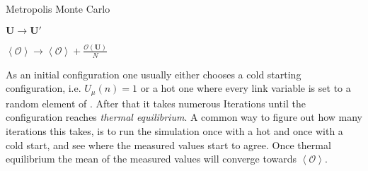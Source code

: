 \begin{algorithm}[!htb]
 \caption{Metropolis Monte Carlo}
 \label{alg:metroMonte}
 \begin{algorithmic}[1]
  \STATE {}

  \STATE {}
  \STATE {}
  \label{code:metroMonteIfCond}
  \STATE {}
  \STATE $\boldsymbol{U} \rightarrow \boldsymbol{U}'$
  \ENDIF

  \ENDFOR
  \STATE $\left\langle \mathcal{O} \right\rangle \rightarrow \left\langle \mathcal{O} \right\rangle + \frac{\mathcal{O}(\boldsymbol{U})}{N} $
  \ENDFOR
 \end{algorithmic}
\end{algorithm}
As an initial configuration one usually either chooses a cold starting configuration, i.e. $U_\mu(n)=1$ or a hot one where every link variable is set to a random element of \SUTwo. After that it takes numerous Iterations until the configuration reaches \emph{thermal equilibrium}. A common way to figure out how many iterations this takes, is to run the simulation once with a hot and once with a cold start, and see where the measured values start to agree. Once thermal equilibrium the mean of the measured values will converge towards $\left\langle \mathcal{O} \right\rangle$.


